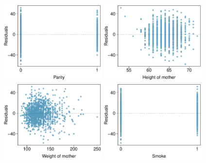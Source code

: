 {\begin{center}
\includegraphics[width=0.4\textwidth]{ch_regr_mult_and_log/figures/eoce/baby_weights_conds/baby_weights_conds_res_parity.pdf} \hspace{5mm}
\includegraphics[width=0.4\textwidth]{ch_regr_mult_and_log/figures/eoce/baby_weights_conds/baby_weights_conds_res_height.pdf}\\[3mm]
\includegraphics[width=0.4\textwidth]{ch_regr_mult_and_log/figures/eoce/baby_weights_conds/baby_weights_conds_res_weight.pdf} \hspace{5mm}
\includegraphics[width=0.4\textwidth]{ch_regr_mult_and_log/figures/eoce/baby_weights_conds/baby_weights_conds_res_smoke.pdf} 
\end{center}
}{}


